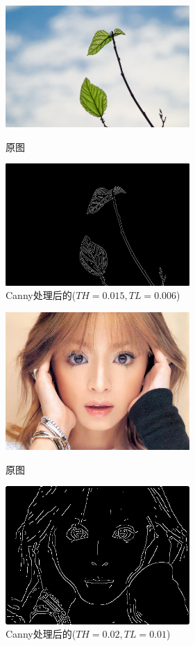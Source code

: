 \documentclass[11pt, a4paper, UTF8]{ctexart}
\begin{document}
\begin{figure}[H]
  \centering
  \begin{minipage}[t]{0.48\textwidth}
  \centering
  \includegraphics[width=7cm]{leaf.jpg}
  \caption{原图}
  \end{minipage}
  \begin{minipage}[t]{0.48\textwidth}
  \centering
  \includegraphics[width=7cm]{Canny_TH=0.015_TL=0.006_leaf.png}
  \caption{Canny处理后的($TH=0.015,TL=0.006$)}
  \end{minipage}
\end{figure}


\begin{figure}[H]
  \centering
  \begin{minipage}[t]{0.48\textwidth}
  \centering
  \includegraphics[width=7cm]{ayu.jpg}
  \caption{原图}
  \end{minipage}
  \begin{minipage}[t]{0.48\textwidth}
  \centering
  \includegraphics[width=7cm]{Canny_TH=0.02_TL=0.01_ayu.png}
  \caption{Canny处理后的($TH=0.02,TL=0.01$)}
  \end{minipage}
\end{figure}
\end{document}
